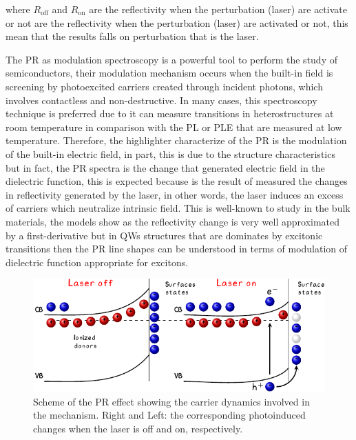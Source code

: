 where $R_{\mathrm{off}}$ and $R_{\mathrm{on}}$ are the reflectivity when the perturbation (laser) are activate or not  are the reflectivity when the perturbation (laser) are activated or not, this mean that the results  falls on perturbation that is the laser.

The PR as modulation spectroscopy is a powerful tool to perform the study of semiconductors, their modulation mechanism occurs when the built-in field is screening by photoexcited carriers created through incident photons, which involves contactless and non-destructive.  In many cases, this spectroscopy technique is preferred due to it can measure transitions in heterostructures at room temperature in comparison with the PL or PLE\cite{shanabrook1987photoreflectance} that are measured at low temperature. Therefore, the highlighter characterize of the PR is the modulation of the built-in electric field, in part, this is due to the structure characteristics but in fact, the PR spectra is the change that generated electric field in the dielectric function, this is expected because is the result of measured the changes in reflectivity generated by the laser, in other words, the laser induces an excess of carriers which neutralize intrinsic field. This is well-known to study in the bulk materials, the models show as the reflectivity change is very well approximated by a first-derivative\cite{seraphin1972electric,aspnes1973surface,misiewicz1999photoreflectance,sydor1989photoreflectanceinterfaces}  but in \gls{QW}s structures that are dominates by excitonic transitions then the PR line shapes can be understood in terms of modulation of dielectric function appropriate for excitons\cite{shanabrook1987photoreflectance,theis1988excitonic,theis1989extrinsic,gontijo1994photoreflectance}. 

\begin{figure}[ht]
	\centering
	\includegraphics[width=\textwidth]{../figures/chapter-3/pr-modulation/build/pr-modulation.pdf}
	\caption{Scheme of the PR effect showing the carrier dynamics involved in the mechanism. Right and Left: the corresponding photoinduced changes when the laser is off and on, respectively. }
	\label{fig:chapter-3-PR-MODULATION-MECHANISM}
\end{figure}

